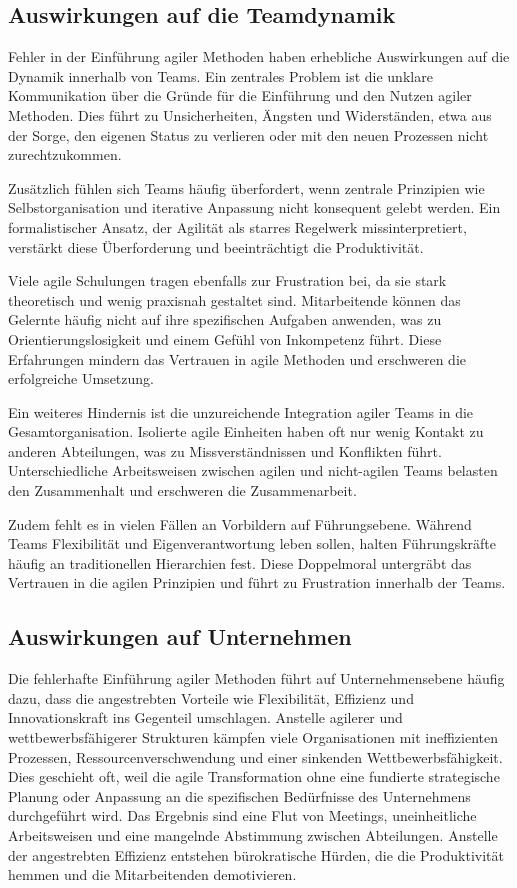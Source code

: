 \documentclass[ngerman]{seminarvorlage}
\begin{document}
\subsection{Auswirkungen auf die Teamdynamik}
Fehler in der Einführung agiler Methoden haben erhebliche Auswirkungen auf die Dynamik innerhalb von Teams. Ein zentrales Problem ist die unklare Kommunikation über die Gründe für die Einführung und den Nutzen agiler Methoden. Dies führt zu Unsicherheiten, Ängsten und Widerständen, etwa aus der Sorge, den eigenen Status zu verlieren oder mit den neuen Prozessen nicht zurechtzukommen.

Zusätzlich fühlen sich Teams häufig überfordert, wenn zentrale Prinzipien wie Selbstorganisation und iterative Anpassung nicht konsequent gelebt werden. Ein formalistischer Ansatz, der Agilität als starres Regelwerk missinterpretiert, verstärkt diese Überforderung und beeinträchtigt die Produktivität.

Viele agile Schulungen tragen ebenfalls zur Frustration bei, da sie stark theoretisch und wenig praxisnah gestaltet sind. Mitarbeitende können das Gelernte häufig nicht auf ihre spezifischen Aufgaben anwenden, was zu Orientierungslosigkeit und einem Gefühl von Inkompetenz führt. Diese Erfahrungen mindern das Vertrauen in agile Methoden und erschweren die erfolgreiche Umsetzung.

Ein weiteres Hindernis ist die unzureichende Integration agiler Teams in die Gesamtorganisation. Isolierte agile Einheiten haben oft nur wenig Kontakt zu anderen Abteilungen, was zu Missverständnissen und Konflikten führt. Unterschiedliche Arbeitsweisen zwischen agilen und nicht-agilen Teams belasten den Zusammenhalt und erschweren die Zusammenarbeit.

Zudem fehlt es in vielen Fällen an Vorbildern auf Führungsebene. Während Teams Flexibilität und Eigenverantwortung leben sollen, halten Führungskräfte häufig an traditionellen Hierarchien fest. Diese Doppelmoral untergräbt das Vertrauen in die agilen Prinzipien und führt zu Frustration innerhalb der Teams.
\cite{moutafis_warum_2019}

\subsection{Auswirkungen auf Unternehmen}
Die fehlerhafte Einführung agiler Methoden führt auf Unternehmensebene häufig dazu, dass die angestrebten Vorteile wie Flexibilität, Effizienz und Innovationskraft ins Gegenteil umschlagen. Anstelle agilerer und wettbewerbsfähigerer Strukturen kämpfen viele Organisationen mit ineffizienten Prozessen, Ressourcenverschwendung und einer sinkenden Wettbewerbsfähigkeit. Dies geschieht oft, weil die agile Transformation ohne eine fundierte strategische Planung oder Anpassung an die spezifischen Bedürfnisse des Unternehmens durchgeführt wird. Das Ergebnis sind eine Flut von Meetings, uneinheitliche Arbeitsweisen und eine mangelnde Abstimmung zwischen Abteilungen. Anstelle der angestrebten Effizienz entstehen bürokratische Hürden, die die Produktivität hemmen und die Mitarbeitenden demotivieren.
\end{document}

